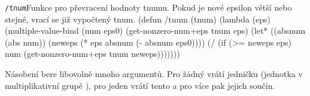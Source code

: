 \begin{lispcode}{\texttt{/tnum}}{Funkce pro převracení hodnoty tnumu. Pokud je nové epsilon větší nebo stejné, vrací se již vypočtený tnum.}
(\textcolor{funkcionalni}{defun} \textcolor{pojmenovan}{/tnum} (tnum)
  (\textcolor{funkcionalni}{lambda} (eps)
    (\textcolor{matematicke}{multiple-value-bind} (num eps0)
      (\textcolor{moje}{get-nonzero-num+eps} tnum eps)
      (\textcolor{vedlejsi}{let*} ((absnum (\textcolor{matematicke}{abs} num))
          (neweps (\textcolor{matematicke}{*} eps absnum (\textcolor{matematicke}{-} absnum eps0))))
        (\textcolor{matematicke}{/} (\textcolor{funkcionalni}{if} (\textcolor{matematicke}{>=} neweps eps) num
          (\textcolor{moje}{get-nonzero-num+eps} tnum neweps)))))))
\end{lispcode}

Násobení bere libovolně mnoho argumentů. Pro žádný vrátí jedničku (jednotka v multiplikativní grupě \cite{RachALG1}), pro jeden vrátí tento a pro více pak jejich součin.

